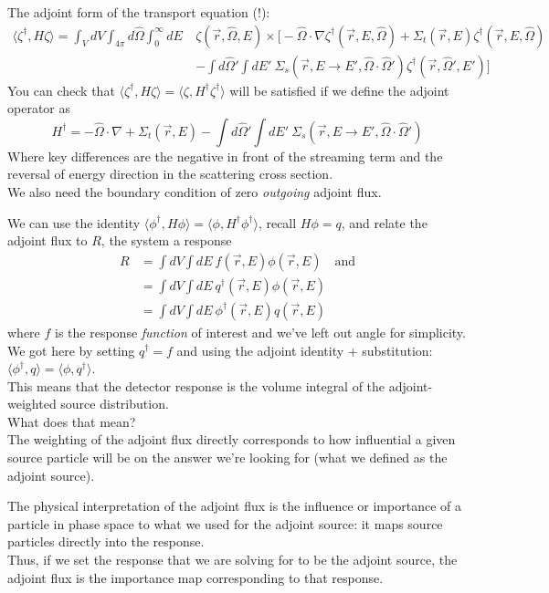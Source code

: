\documentclass[12pt]{article}
\newcommand{\rvec}{\ensuremath{\vec{r}}}
\newcommand{\vOmega}{\ensuremath{\hat{\Omega}}}
\begin{document}
The adjoint form of the transport equation (!):
\begin{align*}
\langle\zeta^{\dagger}, H \zeta\rangle = \int_{V} dV \int_{4\pi} d\vOmega \int_0^{\infty} dE \: &\zeta (\rvec, \vOmega, E) \times \biggl[-\vOmega \cdot \nabla \zeta^{\dagger}(\vec{r}, E, \vOmega)  + \Sigma_t(\rvec,E) \zeta^{\dagger}(\vec{r}, E, \vOmega) \\&- \int d\vOmega' \int dE'\: \Sigma_s(\rvec, E \rightarrow E', \vOmega \cdot \vOmega') \zeta^{\dagger}(\rvec, \vOmega', E') \biggr]
\end{align*}
%
You can check that $\langle\zeta^{\dagger}, H \zeta\rangle = \langle\zeta, H^{\dagger} \zeta^{\dagger}\rangle$ will be satisfied if we define the adjoint operator as
\[
H^{\dagger} = -\vOmega \cdot \nabla  + \Sigma_t(\rvec,E) - \int d\vOmega' \int dE'\: \Sigma_s(\rvec, E \rightarrow E', \vOmega \cdot \vOmega')
\]
Where key differences are the negative in front of the streaming term and the reversal of energy direction in the scattering cross section.\\
We also need the boundary condition of zero \textit{outgoing} adjoint flux.

We can use the identity $\langle \phi^{\dagger}, H \phi\rangle = \langle \phi, H^{\dagger} \phi^{\dagger}\rangle$, recall $H \phi  =q$, and relate the adjoint flux to $R$, the system a response
\begin{align*}
R &= \int dV \int dE\: f(\vec{r}, E) \phi(\vec{r}, E) \quad \text{and}\\
&= \int dV \int dE\: q^{\dagger}(\vec{r}, E) \phi(\vec{r}, E)\\
&= \int dV \int dE\: \phi^{\dagger}(\vec{r}, E) q(\vec{r}, E)
\end{align*}
where $f$ is the response \textit{function} of interest and we've left out angle for simplicity.\\
We got here by setting $q^{\dagger} = f$ and using the adjoint identity + substitution: $\langle \phi^{\dagger}, q\rangle = \langle \phi, q^{\dagger} \rangle$. \\

This means that the detector response is the volume integral of the adjoint-weighted source distribution. \\
What does that mean? \\
The weighting of the adjoint flux directly corresponds to how influential a given source particle will be on the answer we're looking for (what we defined as the adjoint source).


The physical interpretation of the adjoint flux is the influence or importance of a particle in phase space to what we used for the adjoint source: it maps source particles directly into the response. \\
Thus, if we set the response that we are solving for to be the adjoint source, the adjoint flux is the importance map corresponding to that response. 
\end{document}
